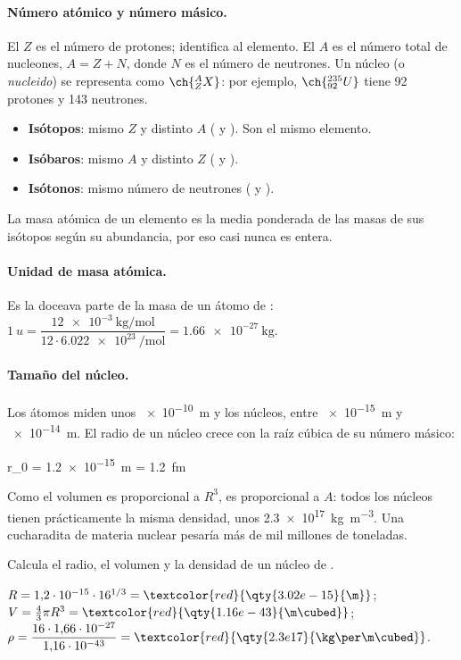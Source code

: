 \paragraph{Número atómico y número másico.} El  \(Z\) es el número de protones; identifica al elemento. El
 \(A\) es el número total de nucleones, \(A = Z + N\), donde \(N\) es el número de neutrones. Un núcleo (o
\emph{nucleido}) se representa como \(\ch{^{A}_{Z}X}\): por ejemplo, \(\ch{^{235}_{92}U}\) tiene 92 protones y 143 neutrones.
\begin{itemize}
    \item \textbf{Isótopos}: mismo \(Z\) y distinto \(A\) ( y ). Son el mismo elemento.
    \item \textbf{Isóbaros}: mismo \(A\) y distinto \(Z\) ( y ).
    \item \textbf{Isótonos}: mismo número de neutrones ( y ).
\end{itemize}
La masa atómica de un elemento es la media ponderada de las masas de sus isótopos según su abundancia, por eso casi nunca es entera.

\paragraph{Unidad de masa atómica.} Es la doceava parte de la masa de un átomo de :
\(\qty{1}{u} = \dfrac{\qty{12e-3}{\kg\per\mol}}{12\cdot\qty{6.022e23}{\per\mol}} = \qty{1.66e-27}{\kg}\).

\paragraph{Tamaño del núcleo.} Los átomos miden unos \qty{e-10}{\m} y los núcleos, entre \qty{e-15}{\m} y \qty{e-14}{\m}. El radio
de un núcleo crece con la raíz cúbica de su número másico:
\begin{centeredequation}
     \qquad r_0 = \qty{1.2e-15}{\m} = \qty{1.2}{\femto\m} \label{eq:nuc-radio}
\end{centeredequation}
Como el volumen es proporcional a \(R^3\), es proporcional a \(A\): todos los núcleos tienen prácticamente la misma densidad, unos
\qty{2.3e17}{\kg\per\m\cubed}. Una cucharadita de materia nuclear pesaría más de mil millones de toneladas.

\begin{exercise}
    Calcula el radio, el volumen y la densidad de un núcleo de .
    \begin{solu}
        \(R = 1{,}2\cdot 10^{-15}\cdot 16^{1/3} = \textcolor{red}{\qty{3.02e-15}{\m}}\); \(V = \tfrac{4}{3}\pi R^3 = \textcolor{red}{\qty{1.16e-43}{\m\cubed}}\);
        \(\rho = \dfrac{16\cdot 1{,}66\cdot 10^{-27}}{1{,}16\cdot 10^{-43}} = \textcolor{red}{\qty{2.3e17}{\kg\per\m\cubed}}\).
    \end{solu}
\end{exercise}

